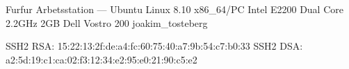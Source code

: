 \documentclass[a5paper]{article}
\begin{document}
   \computerdescription
       {Furfur}
       {Arbetsstation}
       {---}
       {Ubuntu Linux 8.10}
       {x86\_64/PC}
       {Intel E2200 Dual Core 2.2GHz}
       {2GB}
       {Dell Vostro 200}
       {joakim\_tosteberg}



   \sshfingerprintheading
   \begin{sshfingerprint}
SSH2 RSA: 15:22:13:2f:de:a4:fc:60:75:40:a7:9b:54:c7:b0:33
SSH2 DSA: a2:5d:19:c1:ca:02:f3:12:34:e2:95:e0:21:90:c5:e2
   \end{sshfingerprint}
\end{document}
